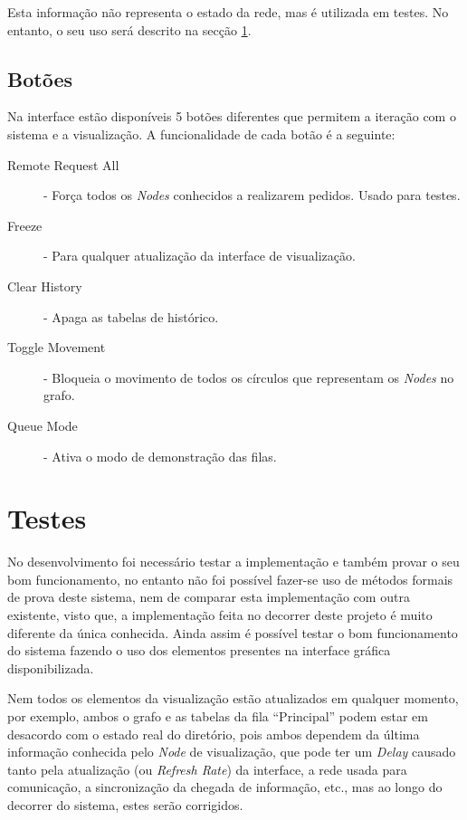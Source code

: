 Esta informação não representa o estado da rede, mas é utilizada em testes. No entanto, o seu uso será descrito na secção \ref{validacao:sec:testes}.

\subsection*{Botões}
Na interface estão disponíveis 5 botões diferentes que permitem a iteração com o sistema e a visualização. A funcionalidade de cada botão é a seguinte:
\begin{description}
    \item [Remote Request All] - Força todos os \emph{Nodes} conhecidos a realizarem pedidos. Usado para testes.
    \item [Freeze] - Para qualquer atualização da interface de visualização.
    \item [Clear History] - Apaga as tabelas de histórico.
    \item [Toggle Movement] - Bloqueia o movimento de todos os círculos que representam os \emph{Nodes} no grafo.
    \item [Queue Mode] - Ativa o modo de demonstração das filas.

\end{description}

\section{Testes}
\label{validacao:sec:testes}
No desenvolvimento foi necessário testar a implementação e também provar o seu bom funcionamento, no entanto não foi possível fazer-se uso de métodos formais de prova deste sistema, nem de comparar esta implementação com outra existente, visto que, a implementação feita no decorrer deste projeto é muito diferente da única conhecida.
Ainda assim é possível testar o bom funcionamento do sistema fazendo o uso dos elementos presentes na interface gráfica disponibilizada.

Nem todos os elementos da visualização estão atualizados em qualquer momento, por exemplo, ambos o grafo e as tabelas da fila ``Principal'' podem estar em desacordo com o estado real do diretório, pois ambos dependem da última informação conhecida pelo \emph{Node} de visualização, que pode ter um \emph{Delay} causado tanto pela atualização (ou \emph{Refresh Rate}) da interface, a rede usada para comunicação, a sincronização da chegada de informação, etc., mas ao longo do decorrer do sistema, estes serão corrigidos.


